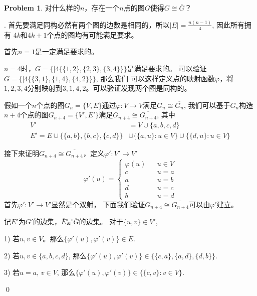 \documentclass[UTF8]{ctexart}
\newenvironment{sol}
  {\par\vspace{3mm}\noindent{\it Solution}.}
  {\qed \\ \medskip}
\theoremstyle{definition}
\newtheorem{problem}{Problem}
\begin{document}
\begin{problem}
对什么样的$n$，存在一个$n$点的图$G$使得$G \cong \overline{G}$？
\begin{sol}
  首先要满足同构必然有两个图的边数是相同的，所以$|E|=\frac {n(n-1)} 4$, 因此所有拥有
  $4k$和$4k+1$个点的图均有可能满足要求。

  首先$n=1$是一定满足要求的。
  
  $n=4$时，$G = \{ [4
   \{ \{ 1, 2\}, \{ 2, 3\}, \{ 3, 4\} \} \}$是满足要求的。
  可以验证$\overline G = \{ [4
   \{ \{ 3, 1\}, \{ 1, 4\}, \{ 4, 2\} \} \}$, 那么我们
  可以这样定义点的映射函数$\varphi$，将$1,2,3,4$分别映射到$3,1,4,2$。可以验证发现两个图是同构的。

  假如一个$n$个点的图$G_n = \{ V, E\}$通过$\varphi : V \rightarrow V$满足$G_n \cong \overline{G_n}$, 我们可以基于$G_n$构造
  $n+4$个点的图$G_{n+4} = \{ V', E'\}$满足$G_{n+4} \cong \overline{G_{n+4}}$, 其中
  \begin{align*}
    V'&=V\cup \{ a, b, c, d \} \\
    E' = E \cup \{ \{ a, b\}, \{ b, c\}, \{ c, d\} \} &\cup \{ \{ a, u \} : u \in V \} \cup \{ \{ d, u \} : u \in V \}  
  \end{align*}

  接下来证明$G_{n+4} \cong \overline{G_{n+4}}$，定义$\varphi':V' \rightarrow V'$
  \begin{equation*}
    \varphi'(u) = \left\{
        \begin{aligned}
            \varphi(u) && u \in V \\
            c && u = a \\
            a && u = b \\
            d && u = c \\
            b && u = d 
        \end{aligned}
    \right.
  \end{equation*}
  首先$\varphi':V' \rightarrow V'$显然是个双射，
  下面我们验证$G_{n+4} \cong \overline{G_{n+4}}$可以由$\varphi'$建立。

  记$\overline{E'}$为$\overline{G'}$的边集，$\overline{E}$是$\overline{G}$的边集。
  对于$\{ u, v \} \in V'$, 
  
  1) 若$u, v \in V$。那么$\{ \varphi'(u), \varphi'(v) \} \in \overline{E}$.

  2) 若$u, v \in \{a, b, c, d\}$, 那么$\{ \varphi'(u), \varphi'(v) \} \in \{ \{c, a\}, \{a, d\}, \{d, b\}\}$.

  3) 若$u=a$, $v \in V$, 那么$\{ \varphi'(u), \varphi'(v) \} \in \{ \{ c, v\} : v \in V \}$.


\end{sol}
\end{problem}
\end{document}
